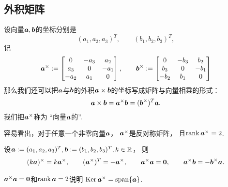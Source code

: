 \subsection{外积矩阵}
设向量\(\boldsymbol{a},\boldsymbol{b}\)的坐标分别是\begin{equation*}
	(a_1,a_2,a_3)^T,
	\qquad
	(b_1,b_2,b_3)^T,
\end{equation*}
记\begin{equation*}
	\boldsymbol{a}^\times
	:=
	\begin{bmatrix}
		0 & -a_3 & a_2 \\
		a_3 & 0 & -a_1 \\
		-a_2 & a_1 & 0 \\
	\end{bmatrix},
	\qquad
	\boldsymbol{b}^\times
	:=
	\begin{bmatrix}
		0 & -b_3 & b_2 \\
		b_3 & 0 & -b_1 \\
		-b_2 & b_1 & 0 \\
	\end{bmatrix}
\end{equation*}
那么我们还可以把\(\boldsymbol{a}\)与\(\boldsymbol{b}\)的外积\(\boldsymbol{a}\times\boldsymbol{b}\)的坐标写成矩阵与向量相乘的形式：\begin{equation}
	\boldsymbol{a}\times\boldsymbol{b}
	= \boldsymbol{a}^\times
	\boldsymbol{b}
	= (\boldsymbol{b}^\times)^T
	\boldsymbol{a}.
\end{equation}
我们把\(\boldsymbol{a}^\times\)称为
“向量\(\boldsymbol{a}\)的”.

容易看出，对于任意一个非零向量\(\boldsymbol{a}\)，
\(\boldsymbol{a}^\times\)是反对称矩阵，
且\(\rank\boldsymbol{a}^\times = 2\).

\begin{property}
设\(
	\boldsymbol{a} := (a_1,a_2,a_3)^T,
	\boldsymbol{b} := (b_1,b_2,b_3)^T,
	k \in \mathbb{R}
\)，
则\begin{equation*}
	(k \boldsymbol{a})^\times
	= k \boldsymbol{a}^\times,
	\qquad
	(\boldsymbol{a}^\times)^T
	= -\boldsymbol{a}^\times,
	\qquad
	\boldsymbol{a}^\times \boldsymbol{a} = \boldsymbol0,
	\qquad
	\boldsymbol{a}^\times \boldsymbol{b}
	= -\boldsymbol{b}^\times \boldsymbol{a}.
\end{equation*}
\end{property}
\begin{remark}
\(\boldsymbol{a}^\times \boldsymbol{a} = \boldsymbol0\)和\(\rank\boldsymbol{a} = 2\)说明
\(\operatorname{Ker}\boldsymbol{a}^\times = \operatorname{span}\{\boldsymbol{a}\}\).
\end{remark}


